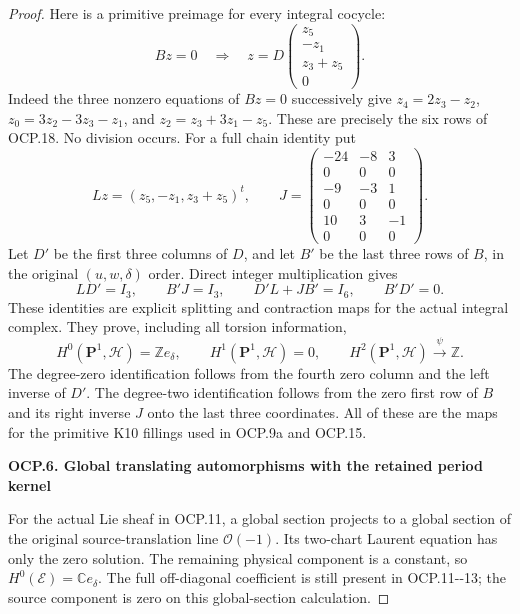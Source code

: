 \begin{proof}
Here is a primitive preimage for every integral cocycle:
\[
Bz=0\quad\Longrightarrow\quad
z=D\begin{pmatrix}z_5\\-z_1\\z_3+z_5\\0\end{pmatrix}.
\tag{OCP.18}
\]
Indeed the three nonzero equations of \(Bz=0\) successively give
\(z_4=2z_3-z_2\),
\(z_0=3z_2-3z_3-z_1\), and
\(z_2=z_3+3z_1-z_5\). These are precisely the six rows of OCP.18.
No division occurs. For a full chain identity put
\[
Lz=(z_5,-z_1,z_3+z_5)^t,
\qquad
J=\begin{pmatrix}
-24&-8&3\\
0&0&0\\
-9&-3&1\\
0&0&0\\
10&3&-1\\
0&0&0
\end{pmatrix}.
\tag{OCP.19}
\]
Let \(D'\) be the first three columns of \(D\), and let \(B'\)
be the last three rows of \(B\), in the original \((u,w,\delta)\)
order. Direct integer multiplication gives
\[
LD'=I_3,\qquad B'J=I_3,\qquad
D'L+JB'=I_6,\qquad B'D'=0.
\tag{OCP.20}
\]
These identities are explicit splitting and contraction maps for the
actual integral complex. They prove, including all torsion information,
\[
H^0(\mathbf P^1,\mathscr H)=\mathbb Ze_\delta,
\qquad H^1(\mathbf P^1,\mathscr H)=0,
\qquad H^2(\mathbf P^1,\mathscr H)
\xrightarrow{\ \psi\ }\mathbb Z.
\tag{OCP.21}
\]
The degree-zero identification follows from the fourth zero column and
the left inverse of \(D'\). The degree-two identification follows from
the zero first row of \(B\) and its right inverse \(J\) onto the last
three coordinates. All of these are the maps for the primitive K10
fillings used in OCP.9a and OCP.15.

\par

\medskip\noindent\textbf{OCP.6. Global translating automorphisms with the retained period kernel}

\par\nobreak

For the actual Lie sheaf in OCP.11, a global section projects to a
global section of the original source-translation line
\(\mathcal O(-1)\). Its two-chart Laurent equation has only the zero
solution. The remaining physical component is a constant, so
\(H^0(\mathscr E)=\mathbb Ce_\delta\). The full off-diagonal
coefficient is still present in OCP.11-\/-13; the source component is
zero on this global-section calculation.


\end{proof}
